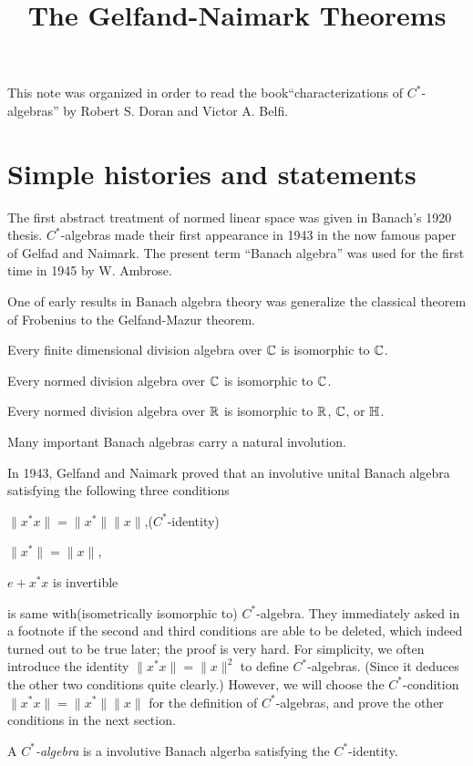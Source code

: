 \documentclass{../exp}
\title{The Gelfand-Naimark Theorems}
\begin{document}
\maketitle

This note was organized in order to read the book``characterizations of $C^*$-algebras'' by Robert S. Doran and Victor A. Belfi.

\section{Simple histories and statements}
The first abstract treatment of normed linear space was given in Banach's 1920 thesis.
$C^*$-algebras made their first appearance in 1943 in the now famous paper of Gelfad and Naimark.
The present term ``Banach algebra'' was used for the first time in 1945 by W. Ambrose.

One of early results in Banach algebra theory was generalize the classical theorem of Frobenius to the Gelfand-Mazur theorem.
\begin{thm}[Frobenius]
Every finite dimensional division algebra over $\mathbb{C}$ is isomorphic to $\mathbb{C}$.
\end{thm}
\begin{thm}
Every normed division algebra over $\mathbb{C}$ is isomorphic to $\mathbb{C}$.
\end{thm}
\begin{thm}[Mazur, 1938]
Every normed division algebra over $\mathbb{R}$ is isomorphic to $\mathbb{R}$, $\mathbb{C}$, or $\mathbb{H}$.
\end{thm}

Many important Banach algebras carry a natural involution.

In 1943, Gelfand and Naimark proved that an involutive unital Banach algebra satisfying the following three conditions
\begin{cond}
\item $\|x^*x\|=\|x^*\|\|x\|$,\hfill($C^*$-identity)
\item $\|x^*\|=\|x\|$,
\item $e+x^*x$ is invertible
\end{cond}
is same with(isometrically isomorphic to) $C^*$-algebra.
They immediately asked in a footnote if the second and third conditions are able to be deleted, which indeed turned out to be true later; the proof is very hard.
For simplicity, we often introduce the identity $\|x^*x\|=\|x\|^2$ to define $C^*$-algebras. (Since it deduces the other two conditions quite clearly.)
However, we will choose the $C^*$-condition $\|x^*x\|=\|x^*\|\|x\|$ for the definition of $C^*$-algebras, and prove the other conditions in the next section.
\begin{defn}
A \emph{$C^*$-algebra} is a involutive Banach algerba satisfying the $C^*$-identity.
\end{defn}
\end{document}
